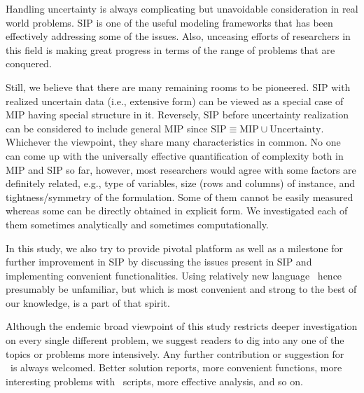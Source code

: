Handling uncertainty is always complicating but unavoidable consideration in real world problems. SIP is one of the useful modeling frameworks that has been effectively addressing some of the issues. Also, unceasing efforts of researchers in this field is making great progress in terms of the range of problems that are conquered. 

Still, we believe that there are many remaining rooms to be pioneered. SIP with realized uncertain data (i.e., extensive form) can be viewed as a special case of MIP having special structure in it. Reversely, SIP before uncertainty realization can be considered to include general MIP since $\textrm{SIP}\equiv\textrm{MIP}\cup\textrm{Uncertainty}$. Whichever the viewpoint, they share many characteristics in common. No one can come up with the universally effective quantification of complexity both in MIP and SIP so far, however, most researchers would agree with some factors are definitely related, e.g., type of variables, size (rows and columns) of instance, and tightness/symmetry of the formulation. Some of them cannot be easily measured whereas some can be directly obtained in explicit form. We investigated each of them sometimes analytically and sometimes computationally.

In this study, we also try to provide pivotal platform as well as a milestone for further improvement in SIP by discussing the issues present in SIP and implementing convenient functionalities. Using relatively new language \julia\ hence presumably be unfamiliar, but which is most convenient and strong to the best of our knowledge, is a part of that spirit. 

Although the endemic broad viewpoint of this study restricts deeper investigation on every single different problem, we suggest readers to dig into any one of the topics or problems more intensively. Any further contribution or suggestion for \siplibtwo\ is always welcomed. Better solution reports, more convenient functions, more interesting problems with \julia\ scripts, more effective analysis, and so on.

